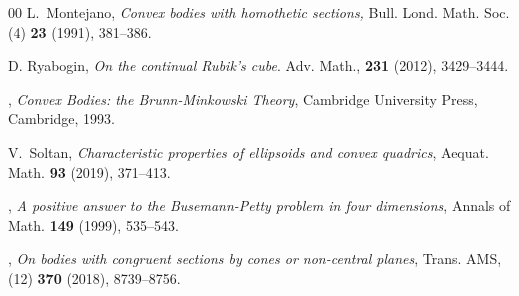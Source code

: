 \documentclass[amsfonts,reqno,11pt]{amsart}
\begin{document}
\begin{thebibliography}{00}
 {\sc L.~Montejano}, {\it Convex bodies with homothetic sections,} Bull. Lond. Math. Soc. (4) {\bf 23} (1991), 381--386.

 {\sc D. Ryabogin}, {\it On the continual Rubik’s cube}. Adv. Math., {\bf 231} (2012), 3429--3444.

,
{\it Convex Bodies: the Brunn-Minkowski Theory}, Cambridge University Press, Cambridge, 1993.

 {\sc V.~Soltan}, {\it Characteristic properties of ellipsoids and convex quadrics}, Aequat. Math. {\bf 93} (2019), 371--413.

, {\it A positive answer to the Busemann-Petty problem in four dimensions}, Annals of Math. {\bf 149} (1999), 535--543.

, {\it On bodies with congruent sections by cones or non-central planes}, Trans. AMS, (12) {\bf 370} (2018), 8739--8756.


\end{thebibliography}
\end{document}
